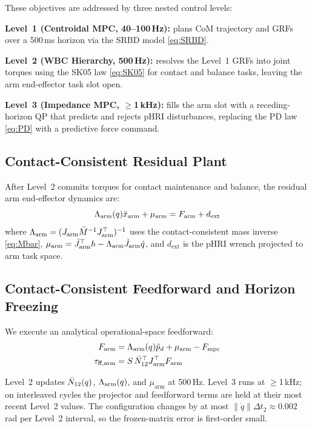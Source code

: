 These objectives are addressed by three nested control levels:

\textbf{Level~1 (Centroidal MPC, 40--100\,Hz):} plans CoM trajectory and
GRFs over a 500\,ms horizon via the SRBD model \eqref{eq:SRBD}.

\textbf{Level~2 (WBC Hierarchy, 500\,Hz):} resolves the Level~1 GRFs into
joint torques using the SK05 law \eqref{eq:SK05} for contact and balance
tasks, leaving the arm end-effector task slot open.

\textbf{Level~3 (Impedance MPC, $\geq$1\,kHz):} fills the arm slot with a
receding-horizon QP that predicts and rejects pHRI disturbances, replacing
the PD law \eqref{eq:PD} with a predictive force command.

\subsection{Contact-Consistent Residual Plant}

After Level~2 commits torques for contact maintenance and balance, the
residual arm end-effector dynamics are:
\begin{equation}\label{eq:plant}
  \Lambda_{\text{arm}}(q)\ddot{x}_{\text{arm}}+\mu_{\text{arm}} = F_{\text{arm}}+d_{\text{ext}}
\end{equation}
where $\Lambda_{\text{arm}}=(J_{\text{arm}}\bar{M}^{-1} J_{\text{arm}}^\top)^{-1}$ uses the
contact-consistent mass inverse \eqref{eq:Mbar},
$\mu_{\text{arm}}=\bar{J}_{\text{arm}}^\top h - \Lambda_{\text{arm}}\dot{J}_{\text{arm}}\dot{q}$,
and $d_{\text{ext}}$ is the pHRI wrench projected to arm task space.

\subsection{Contact-Consistent Feedforward and Horizon Freezing}

We execute an analytical operational-space feedforward:
\begin{subequations}\label{eq:feedforward}
\begin{align}
  F_{\text{arm}} &= \Lambda_{\text{arm}}(q)\ddot{p}_d + \mu_{\text{arm}} - F_{\text{mpc}} \label{eq:ff_a}\\
  \tau_{\text{ff,arm}} &= S\,\bar{N}_{12}^\top J_{\text{arm}}^\top F_{\text{arm}} \label{eq:ff_b}
\end{align}
\end{subequations}

Level~2 updates $\bar{N}_{12}(q)$, $\Lambda_{\text{arm}}(q)$, and $\mu_{\text{arm}}$ at 500\,Hz.
Level~3 runs at $\geq$1\,kHz; on interleaved cycles the projector and
feedforward terms are held at their most recent Level~2 values.
The configuration changes by at most $\|\dot{q}\|\Delta t_2\approx0.002$\,rad
per Level~2 interval, so the frozen-matrix error is first-order small.


